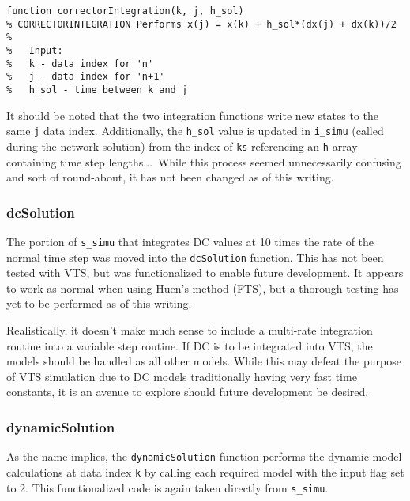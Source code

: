 \begin{verbatim}
function correctorIntegration(k, j, h_sol)
% CORRECTORINTEGRATION Performs x(j) = x(k) + h_sol*(dx(j) + dx(k))/2
%
%   Input:
%   k - data index for 'n'
%   j - data index for 'n+1'
%   h_sol - time between k and j
\end{verbatim}

It should be noted that the two integration functions write new states to the same \verb|j| data index.
Additionally, the \verb|h_sol| value is updated in \verb|i_simu| (called during the network solution) from the index of \verb|ks| referencing an \verb|h| array containing time step lengths$\ldots$\ 
While this process seemed unnecessarily confusing and sort of  round-about, it has not been changed as of this writing.


\subsubsection{dcSolution}  
The portion of \verb|s_simu| that integrates DC values at 10 times the rate of the normal time step was moved into the \verb|dcSolution| function.
This has not been tested with VTS, but was functionalized to enable future development.
It appears to work as normal when using Huen's method (FTS), but a thorough testing has yet to be performed as of this writing.

Realistically, it doesn't make much sense to include a multi-rate integration routine into a variable step routine.
If DC is to be integrated into VTS, the models should be handled as all other models.
While this may defeat the purpose of VTS simulation due to DC models traditionally having very fast time constants, it is an avenue to explore should future development be desired.

\subsubsection{dynamicSolution}  
As the name implies, the \verb|dynamicSolution| function performs the dynamic model calculations at data index \verb|k| by calling each required model with the input flag set to 2.
This functionalized code is again taken directly from \verb|s_simu|.



